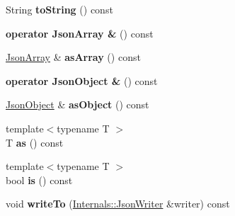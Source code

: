 \begin{DoxyCompactItemize}
\item 
\hypertarget{class_arduino_json_1_1_json_variant_a062fbaa951b70345de4482de8a18280c}{}String {\bfseries to\+String} () const \label{class_arduino_json_1_1_json_variant_a062fbaa951b70345de4482de8a18280c}

\item 
\hypertarget{class_arduino_json_1_1_json_variant_a7c891c976db35d3d559557b601d7589e}{}{\bfseries operator Json\+Array \&} () const \label{class_arduino_json_1_1_json_variant_a7c891c976db35d3d559557b601d7589e}

\item 
\hypertarget{class_arduino_json_1_1_json_variant_a733686942f0d1142eee67de41c314654}{}\hyperlink{class_arduino_json_1_1_json_array}{Json\+Array} \& {\bfseries as\+Array} () const \label{class_arduino_json_1_1_json_variant_a733686942f0d1142eee67de41c314654}

\item 
\hypertarget{class_arduino_json_1_1_json_variant_a41ee36aff9f45c10da571c7e88f39807}{}{\bfseries operator Json\+Object \&} () const \label{class_arduino_json_1_1_json_variant_a41ee36aff9f45c10da571c7e88f39807}

\item 
\hypertarget{class_arduino_json_1_1_json_variant_a0f564a30c942d14788ee280c4cf685d7}{}\hyperlink{class_arduino_json_1_1_json_object}{Json\+Object} \& {\bfseries as\+Object} () const \label{class_arduino_json_1_1_json_variant_a0f564a30c942d14788ee280c4cf685d7}

\item 
\hypertarget{class_arduino_json_1_1_json_variant_a6a683bd87177bb4fd309581608e19f23}{}{\footnotesize template$<$typename T $>$ }\\T {\bfseries as} () const \label{class_arduino_json_1_1_json_variant_a6a683bd87177bb4fd309581608e19f23}

\item 
\hypertarget{class_arduino_json_1_1_json_variant_add706f7fac7a0a0333b5cc55f5094011}{}{\footnotesize template$<$typename T $>$ }\\bool {\bfseries is} () const \label{class_arduino_json_1_1_json_variant_add706f7fac7a0a0333b5cc55f5094011}

\item 
\hypertarget{class_arduino_json_1_1_json_variant_aa7586c7455210e960a87acba191d69bb}{}void {\bfseries write\+To} (\hyperlink{class_arduino_json_1_1_internals_1_1_json_writer}{Internals\+::\+Json\+Writer} \&writer) const \label{class_arduino_json_1_1_json_variant_aa7586c7455210e960a87acba191d69bb}


\end{DoxyCompactItemize}

